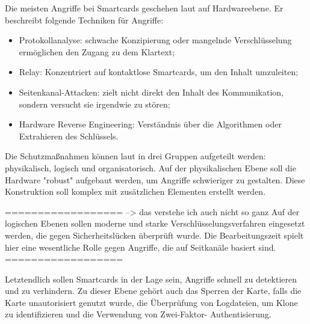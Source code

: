 Die meisten Angriffe bei Smartcards geschehen laut \cite{refmas:ASSS} auf Hardwareebene.
Er beschreibt folgende Techniken für Angriffe:

\begin{itemize}
    \item Protokollanalyse: schwache Konzipierung oder mangelnde Verschlüsselung ermöglichen den Zugang 
    zu dem Klartext; 
    \item Relay: Konzentriert auf kontaktlose Smartcards, um den Inhalt umzuleiten;
    \item Seitenkanal-Attacken: zielt nicht direkt den Inhalt des Kommunikation, sondern versucht sie
    irgendwie zu stören;
    \item Hardware Reverse Engineering: Verständnis über die Algorithmen oder Extrahieren des Schlüssels.
\end{itemize}


Die Schutzmaßnahmen können laut \cite{refmas:ASSS} in drei Gruppen aufgeteilt werden: physikalisch,
logisch und organisatorisch. Auf der physikalischen Ebene soll die Hardware "robust" aufgebaut werden,
um Angriffe schwieriger zu gestalten. Diese Konstruktion soll komplex mit zusätzlichen Elementen erstellt
werden. 



================== --> das verstehe ich auch nicht so ganz 
Auf der logischen Ebenen sollen moderne und starke Verschlüsselungsverfahren
eingesetzt werden, die gegen Sicherheitslücken überprüft wurde. Die Bearbeitungszeit spielt hier
eine wesentliche Rolle gegen Angriffe, die auf Seitkanäle basiert sind. 
==================


Letztendlich sollen Smartcards in der Lage sein, Angriffe schnell zu detektieren und zu verhindern.
Zu dieser Ebene gehört auch das Sperren der Karte, falls die Karte unautorisiert genutzt wurde, 
die Überprüfung von Logdateien, um Klone zu identifizieren und die Verwendung von Zwei-Faktor-
Authentisierung.

